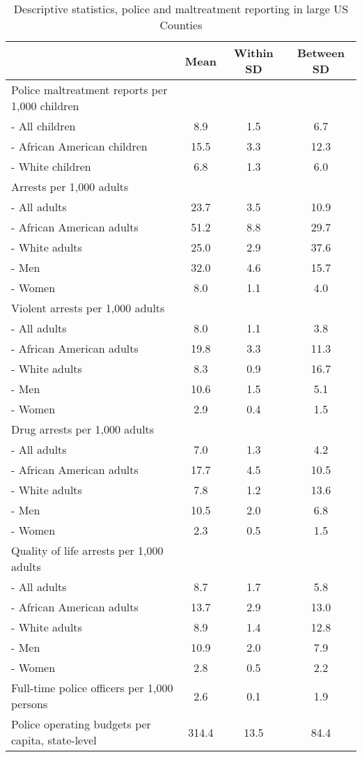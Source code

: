 \begin{table}[ht]
\centering
\caption{Descriptive statistics, police and maltreatment reporting in large US Counties} 
\label{desc3}
\begin{tabular}{lccc}
  \hline
  & Mean & Within SD & Between SD \\ 
  \hline
Police maltreatment reports per 1,000 children &  &  &  \\ 
         - All children & 8.9 & 1.5 & 6.7 \\ 
         - African American children & 15.5 & 3.3 & 12.3 \\ 
         - White children & 6.8 & 1.3 & 6.0 \\ 
  Arrests per 1,000 adults &  &  &  \\ 
         - All adults & 23.7 & 3.5 & 10.9 \\ 
         - African American adults & 51.2 & 8.8 & 29.7 \\ 
         - White adults & 25.0 & 2.9 & 37.6 \\ 
         - Men & 32.0 & 4.6 & 15.7 \\ 
         - Women & 8.0 & 1.1 & 4.0 \\ 
  Violent arrests per 1,000 adults &  &  &  \\ 
         - All adults & 8.0 & 1.1 & 3.8 \\ 
         - African American adults & 19.8 & 3.3 & 11.3 \\ 
         - White adults & 8.3 & 0.9 & 16.7 \\ 
         - Men & 10.6 & 1.5 & 5.1 \\ 
         - Women & 2.9 & 0.4 & 1.5 \\ 
  Drug arrests per 1,000 adults &  &  &  \\ 
         - All adults & 7.0 & 1.3 & 4.2 \\ 
         - African American adults & 17.7 & 4.5 & 10.5 \\ 
         - White adults & 7.8 & 1.2 & 13.6 \\ 
         - Men & 10.5 & 2.0 & 6.8 \\ 
         - Women & 2.3 & 0.5 & 1.5 \\ 
  Quality of life arrests per 1,000 adults &  &  &  \\ 
         - All adults & 8.7 & 1.7 & 5.8 \\ 
         - African American adults & 13.7 & 2.9 & 13.0 \\ 
         - White adults & 8.9 & 1.4 & 12.8 \\ 
         - Men & 10.9 & 2.0 & 7.9 \\ 
         - Women & 2.8 & 0.5 & 2.2 \\ 
  Full-time police officers per 1,000 persons & 2.6 & 0.1 & 1.9 \\ 
  Police operating budgets per capita, state-level & 314.4 & 13.5 & 84.4 \\ 
   \hline
\end{tabular}
\end{table}
